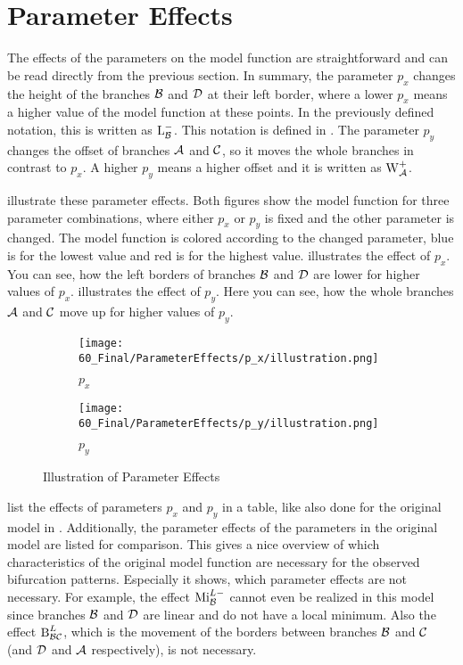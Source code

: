 \section{Parameter Effects}

The effects of the parameters on the model function are straightforward and can be read directly from the previous section.
In summary, the parameter $p_x$ changes the height of the branches $\mathcal{B}$ and $\mathcal{D}$ at their left border, where a lower $p_x$ means a higher value of the model function at these points.
In the previously defined notation, this is written as $\operatorname{L}_{\mathcal{B}}^-$.
This notation is defined in .
The parameter $p_y$ changes the offset of branches $\mathcal{A}$ and $\mathcal{C}$, so it moves the whole branches in contrast to $p_x$.
A higher $p_y$ means a higher offset and it is written as $\operatorname{W}_{\mathcal{A}}^+$.


 illustrate these parameter effects.
Both figures show the model function for three parameter combinations, where either $p_x$ or $p_y$ is fixed and the other parameter is changed.
The model function is colored according to the changed parameter, blue is for the lowest value and red is for the highest value.
 illustrates the effect of $p_x$.
You can see, how the left borders of branches $\mathcal{B}$ and $\mathcal{D}$ are lower for higher values of $p_x$.
 illustrates the effect of $p_y$.
Here you can see, how the whole branches $\mathcal{A}$ and $\mathcal{C}$ move up for higher values of $p_y$.

\begin{figure}
    \centering
    \begin{subfigure}{0.4\textwidth}
        \centering
        \texttt{[image: 60\_Final/ParameterEffects/p\_x/illustration.png]}
        \caption{$p_x$}
        \label{fig:final.param.effects.px}
    \end{subfigure}
    \begin{subfigure}{0.4\textwidth}
        \centering
        \texttt{[image: 60\_Final/ParameterEffects/p\_y/illustration.png]}
        \caption{$p_y$}
        \label{fig:final.param.effects.py}
    \end{subfigure}
    \caption{Illustration of Parameter Effects}
\end{figure}

 list the effects of parameters $p_x$ and $p_y$ in a table, like also done for the original model in .
Additionally, the parameter effects of the parameters in the original model are listed for comparison.
This gives a nice overview of which characteristics of the original model function are necessary for the observed bifurcation patterns.
Especially it shows, which parameter effects are not necessary.
For example, the effect $\operatorname{Mi}_{\mathcal{B}}^{L-}$ cannot even be realized in this model since branches $\mathcal{B}$ and $\mathcal{D}$ are linear and do not have a local minimum.
Also the effect $\operatorname{B}_{\mathcal{B}\mathcal{C}}^L$, which is the movement of the borders between branches $\mathcal{B}$ and $\mathcal{C}$ (and $\mathcal{D}$ and $\mathcal{A}$ respectively), is not necessary.

